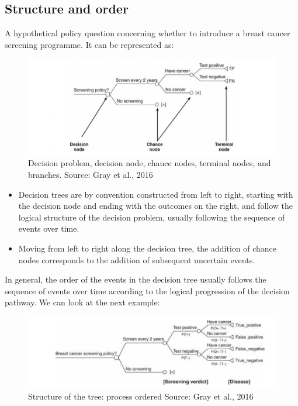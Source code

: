 \documentclass[
]{book}
\providecommand{\tightlist}{%
  \setlength{\itemsep}{0pt}\setlength{\parskip}{0pt}}
\begin{document}
\hypertarget{structure-and-order}{%
\subsection{Structure and order}\label{structure-and-order}}

A hypothetical policy question concerning whether to introduce a breast cancer screening programme. It can be represented as:

\begin{figure}

{\centering \includegraphics[width=24.64in]{images/decision_tree} 

}

\caption{Decision problem, decision node, chance nodes, terminal nodes, and branches. Source: Gray et al., 2016}\label{fig:tree}
\end{figure}

\begin{itemize}
\tightlist
\item
  Decision trees are by convention constructed from left to right, starting with the decision node and ending with the outcomes on the right, and follow the logical structure of the decision problem, usually following the sequence of events over time.
\item
  Moving from left to right along the decision tree, the addition of chance nodes corresponds to the addition of subsequent uncertain events.
\end{itemize}

In general, the order of the events in the decision tree usually follows the sequence of events over time according to the logical progression of the decision pathway. We can look at the next example:

\begin{figure}

{\centering \includegraphics[width=13.28in]{images/decision_tree2} 

}

\caption{Structure of the tree: process ordered Source: Gray et al., 2016}\label{fig:tree2}
\end{figure}
\end{document}
